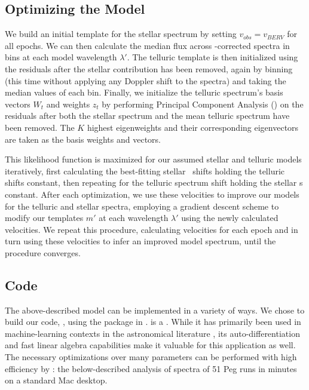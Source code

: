 \documentclass[modern]{aastex62}
\begin{document}
\subsection{Optimizing the Model}

We build an initial template for the stellar spectrum by setting $v_{obs} = v_{BERV}$ for all epochs. We can then calculate the median flux across \BERV-corrected spectra in bins at each model wavelength $\lambda'$. The telluric template is then initialized using the residuals after the stellar contribution has been removed, again by binning (this time without applying any Doppler shift to the spectra) and taking the median values of each bin. Finally, we initialize the telluric spectrum's basis vectors $W_t$ and weights $z_t$ by performing Principal Component Analysis () on the residuals after both the stellar spectrum and the mean telluric spectrum have been removed. The $K$ highest eigenweights and their corresponding eigenvectors are taken as the basis weights and vectors. 

This likelihood function is maximized for our assumed stellar and telluric models iteratively, first calculating the best-fitting stellar \RV\ shifts holding the telluric shifts constant, then repeating for the telluric spectrum shift holding the stellar \RV s constant.
After each optimization, we use these velocities to improve our models for the telluric and stellar spectra, employing a gradient descent scheme to modify our templates $m'$ at each wavelength $\lambda'$ using the newly calculated velocities.
We repeat this procedure, calculating velocities for each epoch and in turn using these velocities to infer an improved model spectrum, until the procedure converges. 

\subsection{Code}

The above-described model can be implemented in a variety of ways. We chose to build our code, \wobble, using the \TF package \todo{[terminology?]} in . 
\TF is a . 
While it has primarily been used in machine-learning contexts in the astronomical literature , its auto-differentiation and fast linear algebra capabilities make it valuable for this application as well. 
The necessary optimizations over many parameters can be performed with high efficiency by \TF: the below-described analysis of  spectra of 51 Peg runs in  minutes on a standard Mac desktop.
\end{document}
